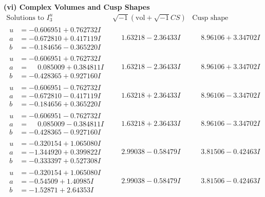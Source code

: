\documentclass[1p]{elsarticle_modified}
\theoremstyle{definition}
\newcommand{\I}{\sqrt{-1}}
\begin{document}
\newpage\flushleft \textbf{(vi) Complex Volumes and Cusp Shapes}
$$\begin{array}{c|c|c}  
\text{Solutions to }I^u_{3}& \I (\text{vol} + \sqrt{-1}CS) & \text{Cusp shape}\\
 \hline 
\begin{aligned}
u &= -0.606951 + 0.762732 I \\
a &= -0.672810 + 0.417119 I \\
b &= -0.184656 - 0.365220 I\end{aligned}
 & \phantom{-}1.63218 - 2.36433 I & \phantom{-}8.96106 + 3.34702 I \\ \hline\begin{aligned}
u &= -0.606951 + 0.762732 I \\
a &= \phantom{-}0.085009 + 0.384811 I \\
b &= -0.428365 + 0.927160 I\end{aligned}
 & \phantom{-}1.63218 - 2.36433 I & \phantom{-}8.96106 + 3.34702 I \\ \hline\begin{aligned}
u &= -0.606951 - 0.762732 I \\
a &= -0.672810 - 0.417119 I \\
b &= -0.184656 + 0.365220 I\end{aligned}
 & \phantom{-}1.63218 + 2.36433 I & \phantom{-}8.96106 - 3.34702 I \\ \hline\begin{aligned}
u &= -0.606951 - 0.762732 I \\
a &= \phantom{-}0.085009 - 0.384811 I \\
b &= -0.428365 - 0.927160 I\end{aligned}
 & \phantom{-}1.63218 + 2.36433 I & \phantom{-}8.96106 - 3.34702 I \\ \hline\begin{aligned}
u &= -0.320154 + 1.065080 I \\
a &= -1.344920 + 0.399822 I \\
b &= -0.333397 + 0.527308 I\end{aligned}
 & \phantom{-}2.99038 - 0.58479 I & \phantom{-}3.81506 - 0.42463 I \\ \hline\begin{aligned}
u &= -0.320154 + 1.065080 I \\
a &= -0.54509 + 1.40985 I \\
b &= -1.52871 + 2.64353 I\end{aligned}
 & \phantom{-}2.99038 - 0.58479 I & \phantom{-}3.81506 - 0.42463 I \\ \hline\begin{aligned}

\end{aligned}
\end{array}$$
\end{document}
